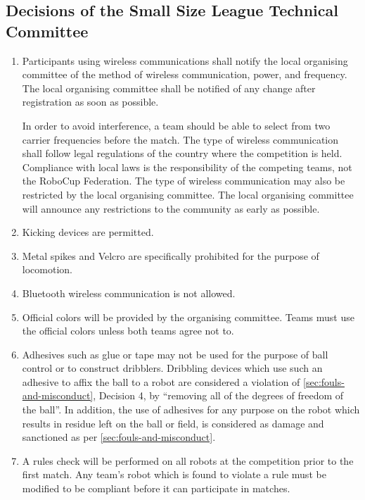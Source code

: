 \subsection*{Decisions of the Small Size League Technical Committee}
\begin{enumerate}
\item
Participants using wireless communications shall notify the local organising committee of the method of wireless communication, power, and frequency.
The local organising committee shall be notified of any change after registration as soon as possible.

In order to avoid interference, a team should be able to select from two carrier frequencies before the match.
The type of wireless communication shall follow legal regulations of the country where the competition is held.
Compliance with local laws is the responsibility of the competing teams, not the RoboCup Federation.
The type of wireless communication may also be restricted by the local organising committee.
The local organising committee will announce any restrictions to the community as early as possible.

\item
Kicking devices are permitted.

\item
Metal spikes and Velcro are specifically prohibited for the purpose of locomotion.

\item
Bluetooth wireless communication is not allowed.

\item
Official colors will be provided by the organising committee.
Teams must use the official colors unless both teams agree not to.

\item
Adhesives such as glue or tape may not be used for the purpose of ball control or to construct dribblers.
Dribbling devices which use such an adhesive to affix the ball to a robot are considered a violation of \autoref{sec:fouls-and-misconduct}, Decision 4, by ``removing all of the degrees of freedom of the ball''.
In addition, the use of adhesives for any purpose on the robot which results in residue left on the ball or field, is considered as damage and sanctioned as per \autoref{sec:fouls-and-misconduct}.

\item
A rules check will be performed on all robots at the competition prior to the first match.
Any team's robot which is found to violate a rule must be modified to be compliant before it can participate in matches.

\end{enumerate}